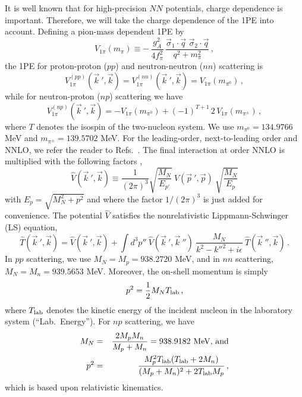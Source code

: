 It is well known that for high-precision $NN$ potentials, charge
dependence is important.  Therefore, we will take the charge
dependence of the 1PE into account.  Defining a pion-mass dependent
1PE by
\[
V_{1\pi} (m_\pi) \equiv - \,
\frac{g_A^2}{4f_\pi^2} \, \frac{ \vec \sigma_1 \cdot \vec q \,\, \vec
  \sigma_2 \cdot \vec q} {q^2 + m_\pi^2} \,,
\]
the 1PE for proton-proton ($pp$) and neutron-neutron ($nn$) scattering
is
\[
V_{1\pi}^{(pp)} ({\vec k}~', \vec k) = V_{1\pi}^{(nn)} ({\vec k}~',
\vec k) = V_{1\pi} (m_{\pi^0}) \,,
\]
while for neutron-proton ($np$) scattering we have
\[
V_{1\pi}^{(np)} ({\vec k}~', \vec k) = -V_{1\pi} (m_{\pi^0}) +
(-1)^{T+1}\, 2\, V_{1\pi} (m_{\pi^\pm}) \,,
\]
where $T$ denotes the isospin of the two-nucleon system.  We use
$m_{\pi^0}=134.9766$ MeV and $m_{\pi^\pm}=139.5702$ MeV.  For the
leading-order, next-to-leading order and NNLO, we refer the reader to
Refs.~\cite{machleidt2011,ekstromPRX}.  The final interaction at
order NNLO is multiplied with the following factors
\cite{machleidt2011},
\begin{equation}
\widehat{V}({\vec k}~',{\vec k}) \equiv \frac{1}{(2\pi)^3}
\sqrt{\frac{M_N}{E_{p'}}}\: {V}({\vec p}~',{\vec p})\:
\sqrt{\frac{M_N}{E_{p}}}
\label{eq_minrel1}
\end{equation}
with $E_p=\sqrt{M_N^2+p^2}$ and where the factor $1/(2\pi)^3$ is just
added for convenience.  The potential $\widehat{V}$ satisfies the
nonrelativistic Lippmann-Schwinger (LS) equation,
\begin{equation}
 \widehat{T}({\vec k}~',{\vec k})= \widehat{V}({\vec k}~',{\vec k})+
 \int d^3p''\: \widehat{V}({\vec k}~',{\vec k}~'')\: \frac{M_N} {{
     k}^{2}-{k''}^{2}+i\epsilon}\: \widehat{T}({\vec k}~'',{\vec k})
 \, .
\label{eq_LS}
\end{equation}
In $pp$ scattering, we use $M_N=M_p=938.2720$ MeV, and in $nn$
scattering, $M_N=M_n=939.5653$ MeV.  Moreover, the on-shell momentum
is simply
\begin{equation}
p^2 = \frac12 M_N T_{\rm lab} \,,
\end{equation}
where $T_{\rm lab}$ denotes the kinetic energy of the incident nucleon
in the laboratory system (``Lab.\ Energy'').  For $np$ scattering, we
have
\begin{eqnarray}
M_N &=& \frac{2M_pM_n}{M_p+M_n} = 938.9182 \mbox{ MeV, and} \\ p^2 & =
& \frac{M_p^2 T_{\rm lab} (T_{\rm lab} + 2M_n)} {(M_p + M_n)^2 +
  2T_{\rm lab} M_p} \,,
\end{eqnarray}
which is based upon relativistic kinematics.

